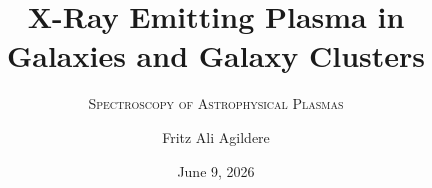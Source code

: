


\author[F. A. Agildere]{Fritz Ali Agildere}

\date[Jun. 9, 2026]{June 9, 2026}

\title{X-Ray Emitting Plasma in Galaxies and Galaxy Clusters}
\subtitle{\textsc{Spectroscopy of Astrophysical Plasmas}}

\institute[UBG]{}


\newcommand{\activesec}{0}
\newcommand{\activesubsec}{0}

\newcommand{\ovsection}[2]{%
    \ifnum\activesec=0\relax
        \transparent{1.0}%
    \else
        \ifnum\activesec=#1\relax
            \transparent{1.0}%
        \else
            \transparent{0.25}%
        \fi
    \fi
    \bfseries{#2}\\[1.5pt]%
}

\newcommand{\ovsubsection}[4][]{
    \ifnum\activesec=0\relax
        \transparent{1.0}%
    \else
        \ifnum\activesec=#2\relax
            \ifnum\activesubsec=0\relax
                \transparent{1.0}
            \else
                \ifnum\activesubsec=#3\relax
                    \transparent{1.0}
                \else
                    \transparent{0.25}
                \fi
            \fi
        \else
            \transparent{0.25}
        \fi
    \fi
    \hspace*{3ex}\mdseries{#4}%
    \if\relax\detokenize{#1}\relax\\\else\\[#1]\fi%
}

\newcommand{\overviewstructure}{%
    \ovsection{1}{Physical Properties}
    \ovsubsection{1}{1}{Galaxy Clusters}
    \ovsubsection[3.0pt]{1}{2}{Radiation Mechanisms}
    
    \ovsection{2}{Radial Profiles}
    \ovsubsection{2}{1}{Data Processing}
    \ovsubsection[3.0pt]{2}{2}{Theory \& Results}
    
    \ovsection{3}{Observations}
    \ovsubsection{3}{1}{Detectors \& Telescopes}
    \ovsubsection{3}{2}{Spectral Characteristics}
    \ovsubsection{3}{3}{Conclusion \& Outlook}
}

